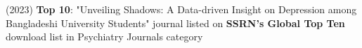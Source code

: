 (2023) \textbf{Top 10}{: "Unveiling Shadows: A Data-driven Insight on Depression among Bangladeshi University Students" journal listed on \textbf{SSRN's Global Top Ten} download list in Psychiatry Journals category} \\